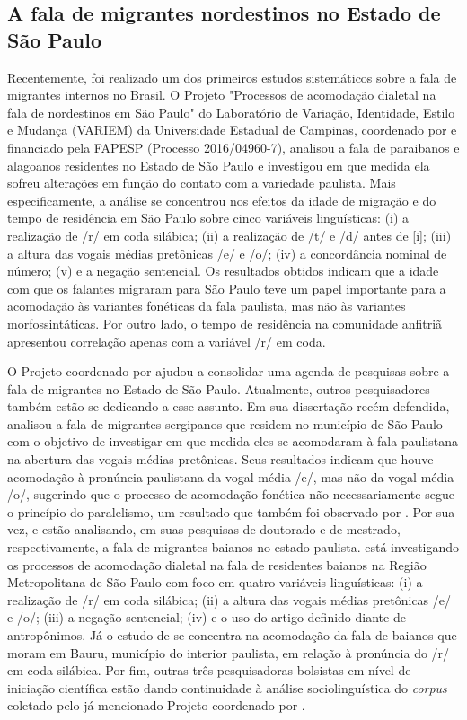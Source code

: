 \documentclass[
	a4paper,	%
	12pt,		%
	]{article}	%
\begin{document}
	\subsection{A fala de migrantes nordestinos no Estado de São Paulo} \label{estudos-sp}

	Recentemente, foi realizado um dos primeiros estudos sistemáticos sobre a fala de migrantes
	internos no Brasil. O Projeto "Processos de acomodação dialetal na fala de nordestinos em São
	Paulo" do Laboratório de Variação, Identidade, Estilo e Mudança (VARIEM) da Universidade
	Estadual de Campinas, coordenado por \citet{Oushiro2018} e financiado pela FAPESP (Processo
	2016/04960-7), analisou a fala de paraibanos e alagoanos residentes no Estado de São Paulo e
	investigou em que medida ela sofreu alterações em função do contato com a variedade paulista.
	Mais especificamente, a análise se concentrou nos efeitos da idade de migração e do tempo de
	residência em São Paulo sobre cinco variáveis linguísticas: (i) a realização de /r/ em coda
	silábica; (ii) a realização de /t/ e /d/ antes de [i]; (iii) a altura das vogais médias
	pretônicas /e/ e /o/; (iv) a concordância nominal de número; (v) e a negação sentencial. Os
	resultados obtidos indicam que a idade com que os falantes migraram para São Paulo teve um papel
	importante para a acomodação às variantes fonéticas da fala paulista, mas não às variantes
	morfossintáticas. Por outro lado, o tempo de residência na comunidade anfitriã apresentou
	correlação apenas com a variável /r/ em coda.

	O Projeto coordenado por \citet{Oushiro2018} ajudou a consolidar uma agenda de pesquisas sobre a
	fala de migrantes no Estado de São Paulo. Atualmente, outros pesquisadores também estão se
	dedicando a esse assunto. Em sua dissertação recém-defendida, \citet{Santana2019} analisou a
	fala de migrantes sergipanos que residem no município de São Paulo com o objetivo de investigar
	em que medida eles se acomodaram à fala paulistana na abertura das vogais médias pretônicas.
	Seus resultados indicam que houve acomodação à pronúncia paulistana da vogal média /e/, mas não
	da vogal média /o/, sugerindo que o processo de acomodação fonética não necessariamente segue o
	princípio do paralelismo, um resultado que também foi observado por \citet{Oushiro2019}. Por sua
	vez, \citet{Souza2017} e \citet{Oliveira2019} estão analisando, em suas pesquisas de doutorado e
	de mestrado, respectivamente, a fala de migrantes baianos no estado paulista.  \citet{Souza2017}
	está investigando os processos de acomodação dialetal na fala de residentes baianos na Região
	Metropolitana de São Paulo com foco em quatro variáveis linguísticas: (i) a realização de /r/ em
	coda silábica; (ii) a altura das vogais médias pretônicas /e/ e /o/; (iii) a negação sentencial;
	(iv) e o uso do artigo definido diante de antropônimos. Já o estudo de \citet{Oliveira2019} se
	concentra na acomodação da fala de baianos que moram em Bauru, município do interior paulista,
	em relação à pronúncia do /r/ em coda silábica. Por fim, outras três pesquisadoras bolsistas em
	nível de iniciação científica estão dando continuidade à análise sociolinguística do
	\emph{corpus} coletado pelo já mencionado Projeto coordenado por \citet{Oushiro2018}.
\end{document}
